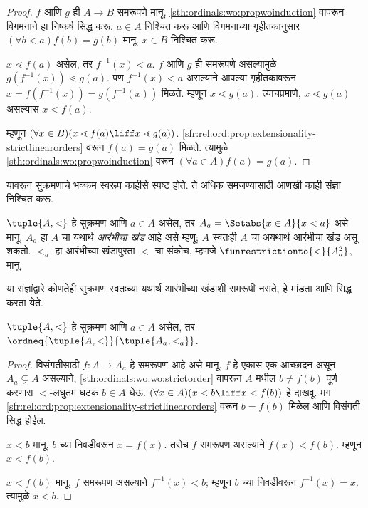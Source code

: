 \begin{proof}
$f$ आणि $g$ ही $A \to B$ समरूपणे मानू. \ref{sth:ordinals:wo:propwoinduction} वापरून विगमनाने हा निष्कर्ष सिद्ध करू.
$a\in A$ निश्चित करू आणि विगमनाच्या गृहीतकानुसार $(\forall b < a)f(b) = g(b)$ मानू. $x \in B$ निश्चित करू.

$x \lessdot f(a)$ असेल, तर $f^{-1}(x) < a$. $f$ आणि $g$ ही समरूपणे असल्यामुळे $g(f^{-1}(x)) \lessdot
g(a)$. पण $f^{-1}(x) < a$ असल्याने आपल्या गृहीतकावरून $x =f(f^{-1}(x)) = g(f^{-1}(x))$ मिळते. म्हणून $x \lessdot g(a)$. त्याचप्रमाणे, $x \lessdot g(a)$ असल्यास $x \lessdot
f(a)$.

म्हणून $(\forall x \in B)(x \lessdot f(a) \liff x \lessdot
g(a))$. \ref{sfr:rel:ord:prop:extensionality-strictlinearorders} वरून $f(a) = g(a)$ मिळते. त्यामुळे \ref{sth:ordinals:wo:propwoinduction} वरून $(\forall
a \in A)f(a) = g(a)$.
\end{proof}\noindent
यावरून सुक्रमणाचे भक्कम स्वरूप काहीसे स्पष्ट होते. ते अधिक समजण्यासाठी आणखी काही संज्ञा निश्चित करू.

\begin{defn}
$\tuple{A, <}$ हे सुक्रमण आणि $a \in A$ असेल, तर $A_a = \Setabs{x \in A}{x
< a}$ असे मानू. $A_a$ हा $A$ चा यथार्थ \emph{आरंभीचा खंड} आहे असे म्हणू; $A$ स्वतःही $A$ चा अयथार्थ आरंभीचा खंड असू शकतो. $<_a$ हा आरंभीच्या खंडापुरता $<$ चा संकोच, म्हणजे $\funrestrictionto{\mathord{<}}{A_a^2}$, मानू.
\end{defn}
\noindent
या संज्ञांद्वारे कोणतेही सुक्रमण स्वतःच्या यथार्थ आरंभीच्या खंडाशी समरूपी नसते, हे मांडता आणि सिद्ध करता येते.

\begin{lem}\label{sth:ordinals:iso:wellordnotinitial}
$\tuple{A, <}$ हे सुक्रमण आणि $a \in A$ असेल, तर
$\ordneq{\tuple{A, <}}{\tuple{A_a, <_a}}$.
\end{lem}

\begin{proof}
विसंगतीसाठी $f \colon A \to A_a$ हे समरूपण आहे असे मानू. $f$ हे एकास-एक आच्छादन असून $A_a \subsetneq A$ असल्याने, \ref{sth:ordinals:wo:wo:strictorder} वापरून $A$ मधील $b \neq f(b)$ पूर्ण करणारा $<$-लघुतम घटक $b \in A$ घेऊ. $(\forall x \in A)(x<b \liff x < f(b))$ हे दाखवू. मग \ref{sfr:rel:ord:prop:extensionality-strictlinearorders} वरून $b = f(b)$ मिळेल आणि विसंगती सिद्ध होईल.

$x < b$ मानू. $b$ च्या निवडीवरून $x = f(x)$. तसेच $f$ समरूपण असल्याने $f(x) < f(b)$. म्हणून $x < f(b)$.

$x < f(b)$ मानू. $f$ समरूपण असल्याने $f^{-1}(x) < b$; म्हणून $b$ च्या निवडीवरून $f^{-1}(x) = x$. त्यामुळे $x < b$.
\end{proof}

